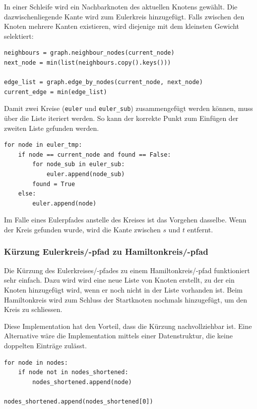 \documentclass[11pt,a4paper]{article}
\begin{document}
\begin{flushleft}
    In einer Schleife wird ein Nachbarknoten des aktuellen Knotens gewählt. Die dazwischenliegende Kante wird zum Eulerkreis hinzugefügt. Falls zwischen den Knoten mehrere Kanten existieren, wird diejenige mit dem kleinsten Gewicht selektiert:
\end{flushleft}
\begin{verbatim}
neighbours = graph.neighbour_nodes(current_node)
next_node = min(list(neighbours.copy().keys()))

edge_list = graph.edge_by_nodes(current_node, next_node)
current_edge = min(edge_list)
\end{verbatim}

\begin{flushleft}
    Damit zwei Kreise (\texttt{euler} und \texttt{euler\_sub}) zusammengefügt werden können, muss über die Liste iteriert werden. So kann der korrekte Punkt zum Einfügen der zweiten Liste gefunden werden.
\end{flushleft}
\begin{verbatim}
for node in euler_tmp:
    if node == current_node and found == False:
        for node_sub in euler_sub:
            euler.append(node_sub)
        found = True
    else:
        euler.append(node)
\end{verbatim}

\begin{flushleft}
   Im Falle eines Eulerpfades anstelle des Kreises ist das Vorgehen dasselbe. Wenn der Kreis gefunden wurde, wird die Kante zwischen $s$ und $t$ entfernt.
\end{flushleft}

\subsubsection{Kürzung Eulerkreis/-pfad zu Hamiltonkreis/-pfad}
Die Kürzung des Eulerkreises/-pfades zu einem Hamiltonkreis/-pfad funktioniert sehr einfach. Dazu wird wird eine neue Liste von Knoten erstellt, zu der ein Knoten hinzugefügt wird, wenn er noch nicht in der Liste vorhanden ist. Beim Hamiltonkreis wird zum Schluss der Startknoten nochmals hinzugefügt, um den Kreis zu schliessen. 

Diese Implementation hat den Vorteil, dass die Kürzung nachvollziehbar ist. Eine Alternative wäre die Implementation mittels einer Datenstruktur, die keine doppelten Einträge zulässt.

\begin{verbatim}
for node in nodes:
    if node not in nodes_shortened:
        nodes_shortened.append(node)

nodes_shortened.append(nodes_shortened[0])
\end{verbatim}
\end{document}
